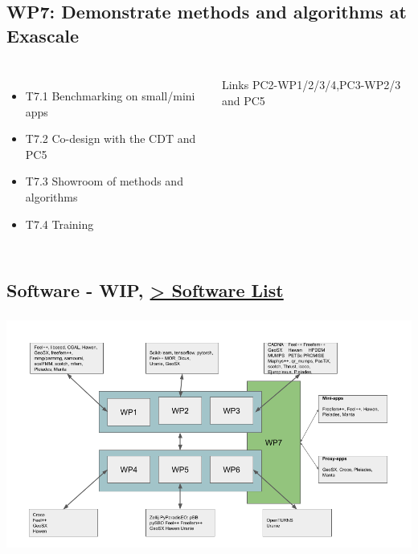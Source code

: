 \subsection{WP7: Demonstrate methods and algorithms at Exascale}
\begin{frame}
  \frametitle{\insertsectionhead}
  \framesubtitle{\insertsubsectionhead}

  \begin{columns}
    \begin{itemize}
      \item T7.1 Benchmarking on small/mini apps 
      \item T7.2 Co-design with the CDT and PC5
      \item T7.3 Showroom of methods and algorithms
      \item T7.4 Training
    \end{itemize}
    \begin{alertblock}{Links}
      PC2-WP1/2/3/4,PC3-WP2/3 and PC5
    \end{alertblock}
   
  \end{columns}
\end{frame}


\subsection{Software - WIP, \href{https://docs.google.com/spreadsheets/d/19v57jpek52nQV2V0tBBON5ivGCz7Bqf3Gw-fHroVHkA/edit#gid=0}{> Software List}}
\begin{frame}
  \frametitle{\insertsectionhead}
  \framesubtitle{\insertsubsectionhead}

  \includegraphics[width=.8\linewidth]{../../figures/exama-software.png}

\end{frame}

